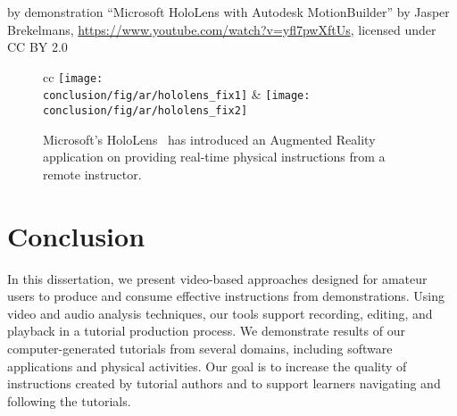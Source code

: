 by demonstration
``Microsoft HoloLens with Autodesk MotionBuilder'' by Jasper Brekelmans, \url{https://www.youtube.com/watch?v=yfl7pwXftUs}, licensed under CC BY 2.0


\begin{figure*}[ht!]
  \centering
\begin{tabular}{cc}
  \texttt{[image: \\conclusion/fig/ar/hololens\_fix1]} &
  \texttt{[image: \\conclusion/fig/ar/hololens\_fix2]} \\
\end{tabular}
\caption{
  Microsoft's HoloLens~\cite{MicrosoftHoloLensSkype} has introduced an Augmented Reality application on providing real-time physical instructions from a remote instructor.
}
\end{figure*}

\section{Conclusion}
In this dissertation, we present video-based approaches designed for amateur users to produce and consume effective instructions from demonstrations. Using video and audio analysis techniques, our tools support recording, editing, and playback in a tutorial production process. We demonstrate results of our computer-generated tutorials from several domains, including software applications and physical activities. Our goal is to increase the quality of instructions created by tutorial authors and to support learners navigating and following the tutorials.
